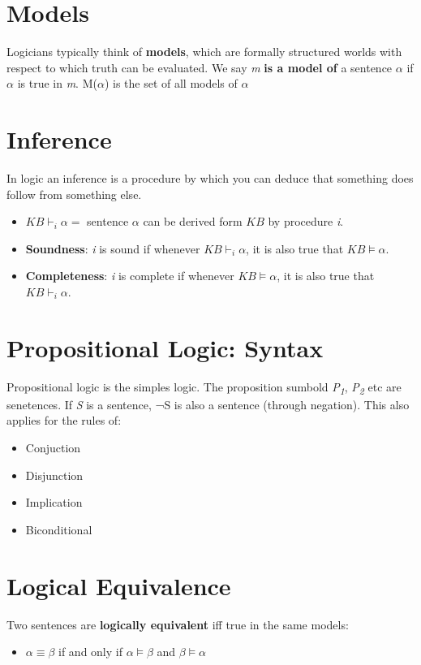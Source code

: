 \documentclass[11pt]{article}
\begin{document}
\section{Models}
\label{sec:org54e56c1}
Logicians typically think of \textbf{models}, which are formally structured worlds with respect to which truth can be evaluated.
We say \emph{m} \textbf{is a model of} a sentence \(\alpha\) if \(\alpha\) is true in \emph{m}.
M(\(\alpha\)) is the set of all models of \(\alpha\)

\section{Inference}
\label{sec:orgb6ce7cf}
In logic an inference is a procedure by which you can deduce that something does follow from something else.
\begin{itemize}
\item \(KB \vdash_i \alpha =\) sentence \(\alpha\) can be derived form \(KB\) by procedure \emph{i}.
\item \textbf{Soundness}: \emph{i} is sound if whenever \(KB \vdash_i \alpha\), it is also true that \(KB \models \alpha\).
\item \textbf{Completeness}: \emph{i} is complete if whenever \(KB \models \alpha\), it is also true that \(KB \vdash_i \alpha\).
\end{itemize}

\section{Propositional Logic: Syntax}
\label{sec:orgfc5d0b1}
Propositional logic is the simples logic.
The proposition sumbold \emph{P\textsubscript{1}}, \emph{P\textsubscript{2}} etc are senetences.
If \emph{S} is a sentence, ¬S is also a sentence (through negation).
This also applies for the rules of:
\begin{itemize}
\item Conjuction
\item Disjunction
\item Implication
\item Biconditional
\end{itemize}

\section{Logical Equivalence}
\label{sec:org06d2780}
Two sentences are \textbf{logically equivalent} iff true in the same models:
\begin{itemize}
\item \(\alpha \equiv \beta\) if and only if \(\alpha \models \beta\) and \(\beta \models \alpha\)
\end{itemize}
\end{document}
